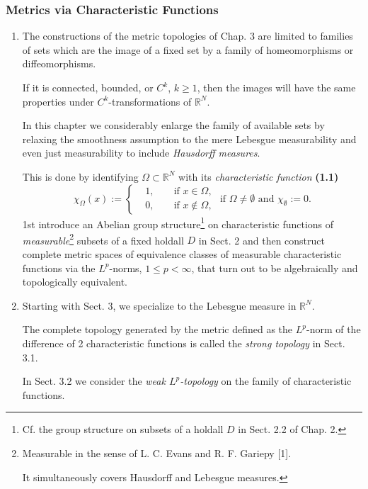\documentclass{book}
\numberwithin{equation}{section}
\begin{document}
\subsubsection{Metrics via Characteristic Functions}
\begin{enumerate}
    \item The constructions of the metric topologies of Chap. 3 are limited to families of sets which are the image of a fixed set by a family of homeomorphisms or diffeomorphisms.
    
    If it is connected, bounded, or $C^k$, $k\ge 1$, then the images will have the same properties under $C^k$-transformations of $\mathbb{R}^N$.
    
    In this chapter we considerably enlarge the family of available sets by relaxing the smoothness assumption to the mere Lebesgue measurability and even just measurability to include \textit{Hausdorff measures}.
    
    This is done by identifying $\Omega\subset\mathbb{R}^N$ with its \textit{characteristic function} \textbf{(1.1)}
    \begin{equation*}
        \chi_\Omega(x) := \left\{\begin{split}
            &1, &&\mbox{ if } x\in\Omega,\\
            &0, &&\mbox{ if } x\notin\Omega,
        \end{split}\right. \mbox{ if } \Omega\ne\emptyset \mbox{ and } \chi_\emptyset := 0.
    \end{equation*}
    1st introduce an Abelian group structure\footnote{Cf. the group structure on subsets of a holdall $D$ in Sect. 2.2 of Chap. 2.} on characteristic functions of \textit{measurable}\footnote{Measurable in the sense of L. C. Evans and R. F. Gariepy [1].
        
        It simultaneously covers Hausdorff and Lebesgue measures.} subsets of a fixed holdall $D$ in Sect. 2 and then construct complete metric spaces of equivalence classes of measurable characteristic functions via the $L^p$-norms, $1\le p < \infty$, that turn out to be algebraically and topologically equivalent.
    \item Starting with Sect. 3, we specialize to the Lebesgue measure in $\mathbb{R}^N$.
    
    The complete topology generated by the metric defined as the $L^p$-norm of the difference of 2 characteristic functions is called the \textit{strong topology} in Sect. 3.1.
    
    In Sect. 3.2 we consider the \textit{weak $L^p$-topology} on the family of characteristic functions.
    

\end{enumerate}
\end{document}
